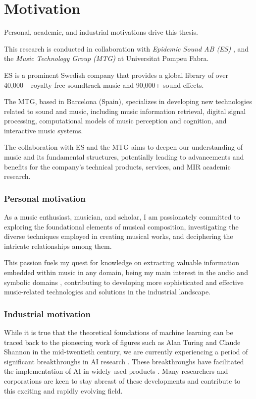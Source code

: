 \section{Motivation}

Personal, academic, and industrial motivations drive this thesis. 

This research is conducted in collaboration with \textit{Epidemic Sound AB (ES)} \cite{EpidemicSite}, and the \textit{Music Technology Group (MTG)} at Universitat Pompeu Fabra.

ES is a prominent Swedish company that provides a global library of over 40,000+ royalty-free soundtrack music and 90,000+ sound effects.

The MTG, based in Barcelona (Spain), specializes in developing new technologies related to sound and music, including music information retrieval, digital signal processing, computational models of music perception and cognition, and interactive music systems. 

The collaboration with ES and the MTG aims to deepen our understanding of music and its fundamental structures, potentially leading to advancements and benefits for the company's technical products, services, and MIR academic research.

\subsubsection{Personal motivation}

As a music enthusiast, musician, and scholar, I am passionately committed to exploring the foundational elements of musical composition, investigating the diverse techniques employed in creating musical works, and deciphering the intricate relationships among them. 

This passion fuels my quest for knowledge on extracting valuable information embedded within music in any domain, being my main interest in the audio and symbolic domains \cite{Crestel2018AOrchestration}\cite{WeilAutomaticSignals}, contributing to developing more sophisticated and effective music-related technologies and solutions in the industrial landscape.

\subsubsection{Industrial motivation}

While it is true that the theoretical foundations of machine learning can be traced back to the pioneering work of figures such as Alan Turing and Claude Shannon in the mid-twentieth century, we are currently experiencing a period of significant breakthroughs in AI research \cite{Vaswani2017AttentionNeed}. These breakthroughs have facilitated the implementation of AI in widely used products \cite{OpenAI2023GPT-4Report}. Many researchers and corporations are keen to stay abreast of these developments and contribute to this exciting and rapidly evolving field.

